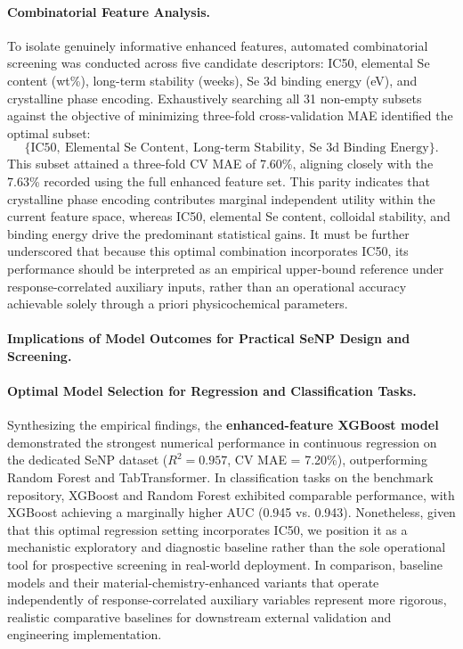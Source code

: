 \paragraph{Combinatorial Feature Analysis.}
To isolate genuinely informative enhanced features, automated combinatorial screening was conducted across five candidate descriptors: IC50, elemental Se content (wt\%), long-term stability (weeks), Se 3d binding energy (eV), and crystalline phase encoding. Exhaustively searching all 31 non-empty subsets against the objective of minimizing three-fold cross-validation MAE identified the optimal subset:
\[
\{\text{IC50},\ \text{Elemental Se Content},\ \text{Long-term Stability},\ \text{Se 3d Binding Energy}\}.
\]
This subset attained a three-fold CV MAE of 7.60\%, aligning closely with the 7.63\% recorded using the full enhanced feature set. This parity indicates that crystalline phase encoding contributes marginal independent utility within the current feature space, whereas IC50, elemental Se content, colloidal stability, and binding energy drive the predominant statistical gains. It must be further underscored that because this optimal combination incorporates IC50, its performance should be interpreted as an empirical upper-bound reference under response-correlated auxiliary inputs, rather than an operational accuracy achievable solely through a priori physicochemical parameters.

\paragraph{Implications of Model Outcomes for Practical SeNP Design and Screening.}

\paragraph{Optimal Model Selection for Regression and Classification Tasks.}
Synthesizing the empirical findings, the \textbf{enhanced-feature XGBoost model} demonstrated the strongest numerical performance in continuous regression on the dedicated SeNP dataset ($R^2 = 0.957$, CV MAE = 7.20\%), outperforming Random Forest and TabTransformer. In classification tasks on the benchmark repository, XGBoost and Random Forest exhibited comparable performance, with XGBoost achieving a marginally higher AUC (0.945 vs. 0.943). Nonetheless, given that this optimal regression setting incorporates IC50, we position it as a mechanistic exploratory and diagnostic baseline rather than the sole operational tool for prospective screening in real-world deployment. In comparison, baseline models and their material-chemistry-enhanced variants that operate independently of response-correlated auxiliary variables represent more rigorous, realistic comparative baselines for downstream external validation and engineering implementation.

